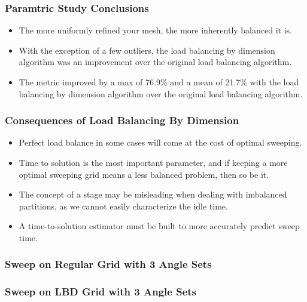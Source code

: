 \documentclass[xcolor={usenames,dvipsnames,svgnames,table}]{beamer}
\begin{document}
\begin{frame}[t]\frametitle{Paramtric Study Conclusions}
  \begin{block}{}
  \begin{itemize}
    \item The more uniformly refined your mesh, the more inherently balanced it is.
    \item With the exception of a few outliers, the load balancing by dimension algorithm was an improvement over the original load balancing algorithm.
    \item The metric improved by a max of 76.9\% and a mean of 21.7\% with the load balancing by dimension algorithm over the original load balancing algorithm. 
  \end{itemize}
  \end{block}
\end{frame}

\begin{frame}[t]\frametitle{Consequences of Load Balancing By Dimension}
  \begin{block}{}
  \begin{itemize}
    \item Perfect load balance in some cases will come at the cost of optimal sweeping.
    \item Time to solution is the most important parameter, and if keeping a more optimal sweeping grid means a less balanced problem, then so be it.
    \item The concept of a stage may be misleading when dealing with imbalanced partitions, as we cannot easily characterize the idle time.
    \item A time-to-solution estimator must be built to more accurately predict sweep time.
  \end{itemize}
  \end{block}
\end{frame}

\begin{frame}[t]\frametitle{Sweep on Regular Grid with 3 Angle Sets}
\end{frame}

\begin{frame}[t]\frametitle{Sweep on LBD Grid with 3 Angle Sets}
\end{frame}
\end{document}
